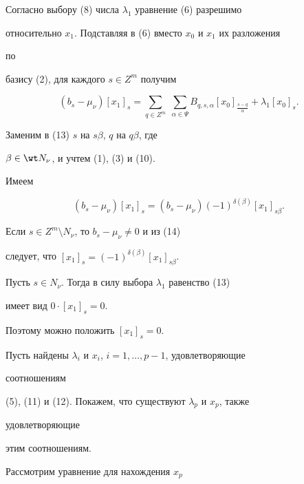 \begin{pf} 


Согласно выбору (8) числа $\lambda_1$ уравнение (6) разрешимо 


относительно $x_1$. Подставляя в (6) вместо $x_0$ и $x_1$ их разложения 


по 


базису (2), для каждого $s\in Z^m$ получим 


\begin{equation} 


(b_s-\mu_\nu)[x_1]_s=\sum_{q\in Z^m}\;\sum_{\alpha\in\Psi} 


B_{q,s,\alpha}[x_0]_{\frac{s-q}{\alpha}}+\lambda_1[x_0]_s. 


\end{equation} 


Заменим в (13) $s$ на $s\beta$, $q$ на $q\beta$, где 


$\beta\in\wt N_\nu$, и учтем (1), (3) и (10). 


Имеем 


\begin{equation} 


(b_s-\mu_\nu)[x_1]_s=(b_s-\mu_\nu)(-1)^{\delta(\beta)} 


[x_1]_{s\beta}. 


\end{equation} 


Если $s\in Z^m\setminus N_\nu$, то $b_s-\mu_\nu\ne 0$ и из (14) 


следует, что $[x_1]_s=(-1)^{\delta(\beta)}[x_1]_{s\beta}$. 


Пусть $s\in N_\nu$. Тогда в силу выбора $\lambda_1$ равенство (13) 


имеет вид $0\cdot[x_1]_s=0$. 


Поэтому можно положить $[x_1]_s=0$. 


 


Пусть найдены $\lambda_i$ и $x_i$, $i=1,\dotsc,p-1$, удовлетворяющие 


соотношениям 


(5), (11) и (12). Покажем, что существуют $\lambda_p$ и $x_p$, также 


удовлетворяющие 


этим соотношениям. 


 


Рассмотрим уравнение для нахождения $x_p$ 


\begin{equation} 



\end{equation}
\end{pf}
